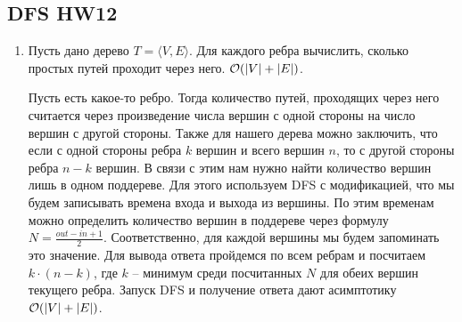 \subsection{DFS HW12}
\begin{enumerate}
    \item Пусть дано дерево $T=\langle V,E\rangle$. Для каждого ребра вычислить, сколько простых путей проходит через него. $\mathcal{O}(|V|+|E|)$.
    \begin{solution}
        Пусть есть какое-то ребро. Тогда количество путей, проходящих через него считается через произведение числа вершин с одной стороны на число вершин с другой стороны. Также для нашего дерева можно заключить, что если с одной стороны ребра $k$ вершин и всего вершин $n$, то с другой стороны ребра $n-k$ вершин. В связи с этим нам нужно найти количество вершин лишь в одном поддереве. Для этого используем DFS с модификацией, что мы будем записывать времена входа и выхода из вершины. По этим временам можно определить количество вершин в поддереве через формулу $N=\frac{out-in+1}{2}$. Соответственно, для каждой вершины мы будем запоминать это значение. Для вывода ответа пройдемся по всем ребрам и посчитаем $k\cdot(n-k)$, где $k$ -- минимум среди посчитанных $N$ для обеих вершин текущего ребра. Запуск DFS и получение ответа дают асимптотику $\mathcal{O}(|V|+|E|)$.
    \end{solution}

\end{enumerate}
